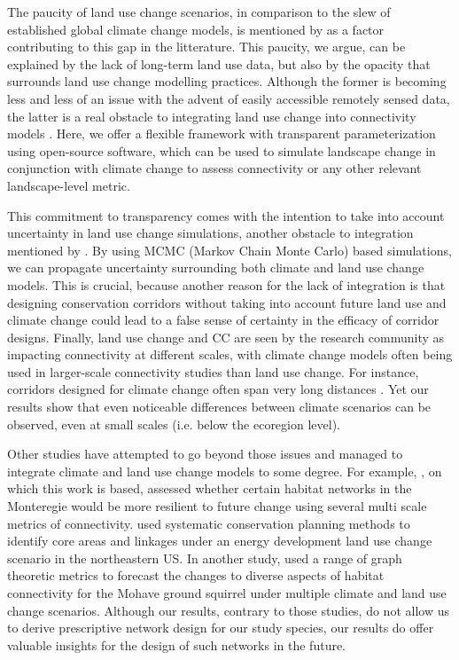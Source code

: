The paucity of land use change scenarios, in comparison to the slew of established global climate change models, is mentioned by \cite{costanza_landscape_2019} as a factor contributing to this gap in the litterature. This paucity, we argue, can be explained by the lack of long-term land use data, but also by the opacity that surrounds land use change modelling practices. Although the former is becoming less and less of an issue with the advent of easily accessible remotely sensed data, the latter is a real obstacle to integrating land use change into connectivity models \citep{moulds_open_2015}. Here, we offer a flexible framework with transparent parameterization using open-source software, which can be used to simulate landscape change in conjunction with climate change to assess connectivity or any other relevant landscape-level metric. 

This commitment to transparency comes with the intention to take into account uncertainty in land use change simulations, another obstacle to integration mentioned by \cite{costanza_landscape_2019}. By using MCMC (Markov Chain Monte Carlo) based simulations, we can propagate uncertainty surrounding both climate and land use change models. This is crucial, because another reason for the lack of integration is that designing conservation corridors without taking into account future land use and climate change could lead to a false sense of certainty in the efficacy of corridor designs. Finally, land use change and CC are seen by the research community as impacting connectivity at different scales, with climate change models often being used in larger-scale connectivity studies than land use change. For instance, corridors designed for climate change often span very long distances \citep{mcguire_achieving_2016}. Yet our results show that even noticeable differences between climate scenarios can be observed, even at small scales (i.e. below the ecoregion level).

Other studies have attempted to go beyond those issues and managed to integrate climate and land use change models to some degree. For example, \cite{albert_applying_2017}, on which this work is based, assessed whether certain habitat networks in the Monteregie would be more resilient to future change using several multi scale metrics of connectivity. \cite{leonard_landscape-scale_2017} used systematic conservation planning methods to identify core areas and linkages under an energy development land use change scenario in the northeastern US. In another study, \cite{dilts_multiscale_2016} used a range of graph theoretic metrics to forecast the changes to diverse aspects of habitat connectivity for the Mohave ground squirrel under multiple climate and land use change scenarios. Although our results, contrary to those studies, do not allow us to derive prescriptive network design for our study species, our results do offer valuable insights for the design of such networks in the future.

